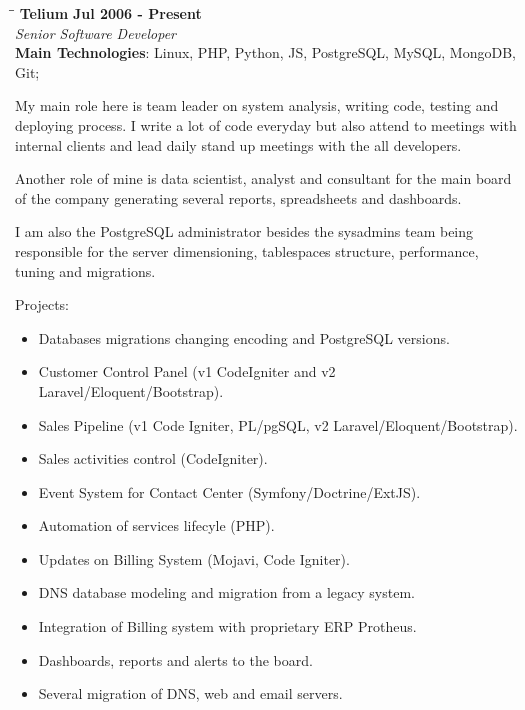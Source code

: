 \documentclass[margin]{res}
\begin{document}
\begin{resume}
\vspace{-0.1in}
   \begin{tabbing}
   \hspace{2.3in}\= \hspace{1.7in}\= \kill %
    \textbf{Telium}    \>\>\textbf{Jul 2006 - Present}\\
    \textit{Senior Software Developer}\\        
    \textbf{Main Technologies}: Linux, PHP, Python, JS, PostgreSQL, MySQL, MongoDB, Git;
   \end{tabbing}\vspace{-20pt}      %
    \vspace{2mm}
    My main role here is team leader on system analysis, writing code, testing and deploying process. I write a lot of code everyday but also attend to meetings with internal clients and lead daily stand up meetings with the all developers.

    Another role of mine is data scientist, analyst and consultant for the main board of the company generating several reports, spreadsheets and dashboards.

    I am also the PostgreSQL administrator besides the sysadmins team being responsible for the server dimensioning, tablespaces structure, performance, tuning and migrations.

    Projects:
    \begin{itemize}
      \item Databases migrations changing encoding and PostgreSQL versions.
      \item Customer Control Panel (v1 CodeIgniter and v2 Laravel/Eloquent/Bootstrap).
      \item Sales Pipeline (v1 Code Igniter, PL/pgSQL, v2 Laravel/Eloquent/Bootstrap).
      \item Sales activities control (CodeIgniter).
      \item Event System for Contact Center (Symfony/Doctrine/ExtJS).
      \item Automation of services lifecyle (PHP).
      \item Updates on Billing System (Mojavi, Code Igniter).
      \item DNS database modeling and migration from a legacy system.
      \item Integration of Billing system with proprietary ERP Protheus.
      \item Dashboards, reports and alerts to the board.
      \item Several migration of DNS, web and email servers.
    \end{itemize}


\end{resume}
\end{document}
